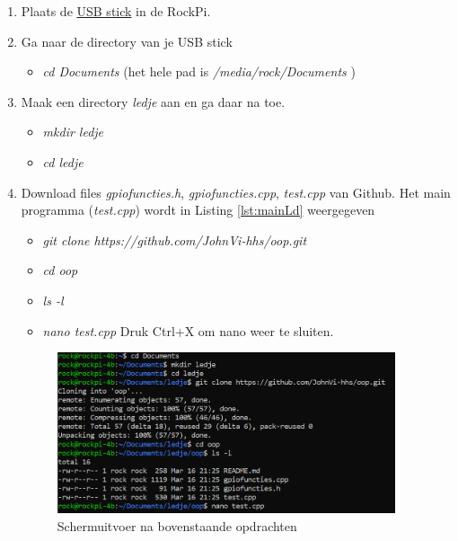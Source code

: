 \begin{enumerate}
	\item Plaats de \hyperlink{chp:USBstick}{USB stick} in de RockPi.
	\item Ga naar de directory van je USB stick
	\begin{itemize}
		\item \textit{cd Documents} (het hele pad is \textit{/media/rock/Documents} )
	\end{itemize}
    
    \item Maak een directory \textit{ledje} aan en ga daar na toe.
	\begin{itemize}
	    \item \textit{mkdir ledje}
	    \item \textit{cd ledje}
    \end{itemize}  
   \item Download files \textit{gpiofuncties.h}, \textit{gpiofuncties.cpp}, \textit{test.cpp} van Github. Het main programma (\textit{test.cpp}) wordt in Listing \ref{lst:mainLd} weergegeven
   	\begin{itemize}
     	\item \textit{git clone https://github.com/JohnVi-hhs/oop.git}
     	\item \textit{cd oop}
     	\item \textit{ls -l}
     	\item \textit{nano test.cpp} Druk Ctrl+X om nano weer te sluiten.
   \end{itemize}

\clearpage
\begin{figure}[h!]
	\centering
	\begin{center} 	
		\includegraphics[width=0.94\textwidth]{figuren/gitclone}
		\caption{Schermuitvoer na bovenstaande opdrachten}
		\label{fig:gitclone}   
	\end{center}
\end{figure}


\end{enumerate}
